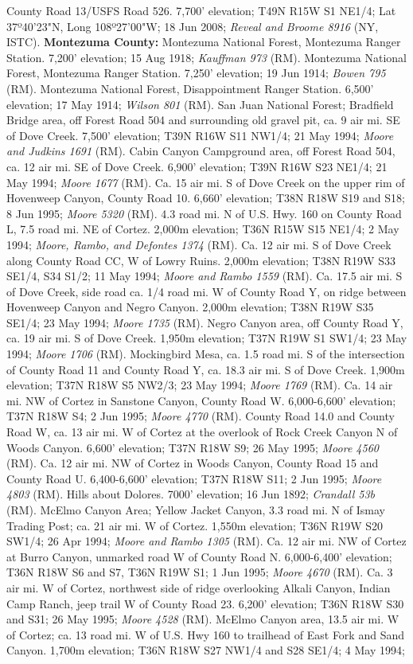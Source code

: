 County Road 13/USFS Road 526. 7,700' elevation; T49N R15W S1 NE1/4; Lat 37º40'23"N, Long 108º27'00"W; 18 Jun 2008; \textit{Reveal and Broome 8916} (NY, ISTC).  \textbf{Montezuma County:} Montezuma National Forest, Montezuma Ranger Station. 7,200' elevation; 15 Aug 1918; \textit{Kauffman 973} (RM).  Montezuma National Forest, Montezuma Ranger Station. 7,250' elevation; 19 Jun 1914; \textit{Bowen 795} (RM).  Montezuma National Forest, Disappointment Ranger Station. 6,500' elevation; 17 May 1914; \textit{Wilson 801} (RM).  San Juan National Forest; Bradfield Bridge area, off Forest Road 504 and surrounding old gravel pit, ca. 9 air mi. SE of Dove Creek. 7,500' elevation; T39N R16W S11 NW1/4; 21 May 1994; \textit{Moore and Judkins 1691} (RM).  Cabin Canyon Campground area, off Forest Road 504, ca. 12 air mi. SE of Dove Creek. 6,900' elevation; T39N R16W S23 NE1/4; 21 May 1994; \textit{Moore 1677} (RM).  Ca. 15 air mi. S of Dove Creek on the upper rim of Hovenweep Canyon, County Road 10. 6,660' elevation; T38N R18W S19 and S18; 8 Jun 1995; \textit{Moore 5320} (RM). 4.3 road mi. N of U.S. Hwy. 160 on County Road L, 7.5 road mi. NE of Cortez. 2,000m elevation; T36N R15W S15 NE1/4; 2 May 1994; \textit{Moore, Rambo, and Defontes 1374} (RM).  Ca. 12 air mi. S of Dove Creek along County Road CC, W of Lowry Ruins. 2,000m elevation; T38N R19W S33 SE1/4, S34 S1/2; 11 May 1994; \textit{Moore and Rambo 1559} (RM).  Ca. 17.5 air mi. S of Dove Creek, side road ca. 1/4 road mi. W of County Road Y, on ridge between Hovenweep Canyon and Negro Canyon. 2,000m elevation; T38N R19W S35 SE1/4; 23 May 1994; \textit{Moore 1735} (RM).  Negro Canyon area, off County Road Y, ca. 19 air mi. S of Dove Creek. 1,950m elevation; T37N R19W S1 SW1/4; 23 May 1994; \textit{Moore 1706} (RM).  Mockingbird Mesa, ca. 1.5 road mi. S of the intersection of County Road 11 and County Road Y, ca. 18.3 air mi. S of Dove Creek. 1,900m elevation; T37N R18W S5 NW2/3; 23 May 1994; \textit{Moore 1769} (RM).  Ca. 14 air mi. NW of Cortez in Sanstone Canyon, County Road W. 6,000-6,600' elevation; T37N R18W S4; 2 Jun 1995; \textit{Moore 4770} (RM).  County Road 14.0 and County Road W, ca. 13 air mi. W of Cortez at the overlook of Rock Creek Canyon N of Woods Canyon. 6,600' elevation; T37N R18W S9; 26 May 1995; \textit{Moore 4560} (RM).  Ca. 12 air mi. NW of Cortez in Woods Canyon, County Road 15 and County Road U. 6,400-6,600' elevation; T37N R18W S11; 2 Jun 1995; \textit{Moore 4803} (RM).  Hills about Dolores. 7000' elevation; 16 Jun 1892; \textit{Crandall 53b} (RM).  McElmo Canyon Area; Yellow Jacket Canyon, 3.3 road mi. N of Ismay Trading Post; ca. 21 air mi. W of Cortez. 1,550m elevation; T36N R19W S20 SW1/4; 26 Apr 1994; \textit{Moore and Rambo 1305} (RM).  Ca. 12 air mi. NW of Cortez at Burro Canyon, unmarked road W of County Road N. 6,000-6,400' elevation; T36N R18W S6 and S7, T36N R19W S1; 1 Jun 1995; \textit{Moore 4670} (RM).  Ca. 3 air mi. W of Cortez, northwest side of ridge overlooking Alkali Canyon, Indian Camp Ranch, jeep trail W of County Road 23. 6,200' elevation; T36N R18W S30 and S31; 26 May 1995; \textit{Moore 4528} (RM).  McElmo Canyon area, 13.5 air mi. W of Cortez; ca. 13 road mi. W of U.S. Hwy 160 to trailhead of East Fork and Sand Canyon. 1,700m elevation; T36N R18W S27 NW1/4 and S28 SE1/4; 4 May 1994; 